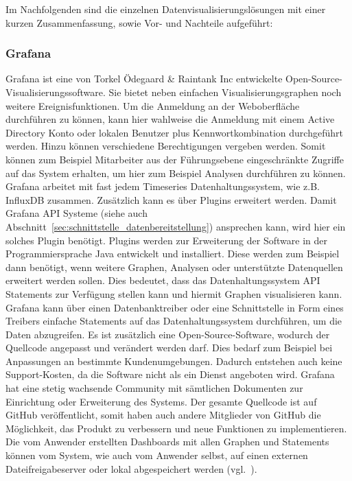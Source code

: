 {Im Nachfolgenden sind die einzelnen Datenvisualisierungslösungen mit einer
kurzen Zusammenfassung, sowie Vor- und Nachteile aufgeführt:
\mr%

\subsubsection{Grafana}
\label{subsubsec:grafana}
Grafana ist eine von Torkel Ödegaard \& Raintank Inc entwickelte
Open\hyp{}Source\hyp{}Visualisierungssoftware. Sie bietet neben einfachen
Visualisierungsgraphen noch weitere Ereignisfunktionen. Um die Anmeldung an der
Weboberfläche durchführen zu können, kann hier wahlweise die Anmeldung mit
einem \gls{Active Directory} Konto oder lokalen Benutzer plus
Kennwortkombination durchgeführt werden. Hinzu können verschiedene
Berechtigungen vergeben werden. Somit können zum Beispiel Mitarbeiter aus der
Führungsebene eingeschränkte Zugriffe auf das System erhalten, um hier zum
Beispiel Analysen durchführen zu können. Grafana arbeitet mit fast jedem
Timeseries Datenhaltungssystem, wie z.B. InfluxDB zusammen. Zusätzlich kann es
über Plugins erweitert werden. Damit Grafana API Systeme (siehe auch
Abschnitt~\ref{sec:schnittstelle_datenbereitstellung}) ansprechen kann, wird
hier ein solches Plugin benötigt. Plugins werden zur Erweiterung der Software
in der Programmiersprache Java entwickelt und installiert. Diese werden zum
Beispiel dann benötigt, wenn weitere Graphen, Analysen oder unterstützte
Datenquellen erweitert werden sollen. Dies bedeutet, dass das
Datenhaltungssystem API Statements zur Verfügung stellen kann und hiermit
Graphen visualisieren kann. Grafana kann über einen \gls{Datenbanktreiber} oder
eine Schnittstelle in Form eines Treibers einfache Statements auf das
Datenhaltungssystem durchführen, um die Daten abzugreifen. Es ist zusätzlich
eine Open\hyp{}Source\hyp{}Software, wodurch der Quellcode angepasst und
verändert werden darf. Dies bedarf zum Beispiel bei Anpassungen an bestimmte
Kundenumgebungen.  Dadurch entstehen auch keine Support\hyp{}Kosten, da die
Software nicht als ein Dienst angeboten wird. Grafana hat eine stetig wachsende
Community mit sämtlichen Dokumenten zur Einrichtung oder Erweiterung des
Systems. Der gesamte Quellcode ist auf GitHub veröffentlicht, somit haben auch
andere Mitglieder von GitHub die Möglichkeit, das Produkt zu verbessern und
neue Funktionen zu implementieren. Die vom Anwender erstellten Dashboards mit
allen Graphen und Statements können vom System, wie auch vom Anwender selbst,
auf einen externen Dateifreigabeserver oder lokal abgespeichert werden
(vgl.~\cite{grafana}).

}
